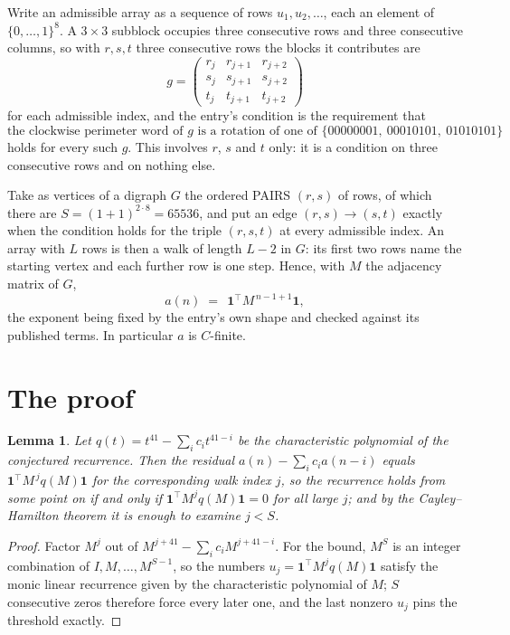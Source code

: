 \documentclass[11pt,a4paper]{article}
\theoremstyle{plain}
\newtheorem{lemma}[theorem]{Lemma}
\theoremstyle{definition}
\begin{document}
Write an admissible array as a sequence of rows $u_1,u_2,\dots$, each an element of
$\{0,\dots,1\}^{8}$. A $3\times3$ subblock occupies three consecutive rows and
three consecutive columns, so with $r,s,t$ three consecutive rows the blocks it
contributes are
\[
g=\begin{pmatrix}r_j&r_{j+1}&r_{j+2}\\ s_j&s_{j+1}&s_{j+2}\\ t_j&t_{j+1}&t_{j+2}\end{pmatrix}
\]
for each admissible index, and the entry's condition is the requirement that
\[
\text{the clockwise perimeter word of }g\text{ is a rotation of one of }\{00000001,\ 00010101,\ 01010101\}
\]
holds for every such $g$. This involves $r$, $s$ and $t$ only: it is a condition on
three consecutive rows and on nothing else.

Take as vertices of a digraph $G$ the ordered PAIRS $(r,s)$ of rows, of which there are
$S=(1+1)^{2\cdot8}=65536$, and put an edge $(r,s)\to(s,t)$ exactly when the condition
holds for the triple $(r,s,t)$ at every admissible index. An array with $L$ rows is then a
walk of length $L-2$ in $G$: its first two rows name the starting vertex and each further
row is one step. Hence, with $M$ the adjacency matrix of $G$,
\[
a(n)\;=\;\,\mathbf{1}^{\!\top}M^{\,n-1+1}\mathbf{1},
\]
the exponent being fixed by the entry's own shape and checked against its published terms.
In particular $a$ is $C$-finite.

\section{The proof}

\begin{lemma}\label{lem:crit}
Let $q(t)=t^{41}-\sum_i c_it^{41-i}$ be the characteristic polynomial of the
conjectured recurrence. Then the residual $a(n)-\sum_ic_ia(n-i)$ equals
$\mathbf{1}^{\!\top}M^{\,j}q(M)\mathbf{1}$ for the corresponding walk index
$j$, so the recurrence holds from some point on if and only if
$\mathbf{1}^{\!\top}M^{j}q(M)\mathbf{1}=0$ for all large $j$; and by the
Cayley--Hamilton theorem it is enough to examine $j<S$.
\end{lemma}

\begin{proof}
Factor $M^{j}$ out of $M^{j+41}-\sum_ic_iM^{j+41-i}$. For the bound, $M^{S}$
is an integer combination of $I,M,\dots,M^{S-1}$, so the numbers
$u_j=\mathbf{1}^{\!\top}M^{j}q(M)\mathbf{1}$ satisfy the monic linear recurrence given by
the characteristic polynomial of $M$; $S$ consecutive zeros therefore force every later one,
and the last nonzero $u_j$ pins the threshold exactly.
\end{proof}
\end{document}
